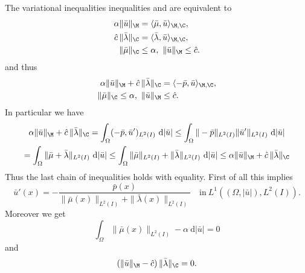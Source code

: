 The variational inequalities inequalities \label{var ineq mu} and \label{var ineq lambda} are equivalent to
\begin{align*}
\alpha\|\bar u\|_{\M}&=\langle \bar\mu,\bar u\rangle_{\M,\C},\\
\hat c\,\|\bar\lambda\|_{\C}&=\langle \bar\lambda,\bar u\rangle_{\M,\C},\\
\|\bar \mu\|_{\C}&\leq\alpha,~\|\bar u\|_{\M}\leq \hat c.
\end{align*}
and thus
\begin{align*}
\alpha\|\bar u\|_{\M}+\hat c\,\|\bar\lambda\|_{\C}&=\langle -\bar p,\bar u\rangle_{\M,\C},\\
\|\bar \mu\|_{\C}\leq\alpha,~\|\bar u\|_{\M}&\leq \hat c.
\end{align*}
In particular we have
\begin{multline*}
\alpha\|\bar u\|_{\M}+\hat c\,\|\bar\lambda\|_{\C}= \int_\Omega(-\bar p,\bar u')_{L^2(I)}~\mathrm d|\bar u|
\leq \int_\Omega\|-\bar p\|_{L^2(I)}\|\bar u'\|_{L^2(I)}~\mathrm d|\bar u|\\
= \int_\Omega\|\bar\mu+\bar\lambda\|_{L^2(I)}~\mathrm d|\bar u|
\leq\int_\Omega\|\bar\mu\|_{L^2(I)}+\|\bar\lambda\|_{L^2(I)}~\mathrm d|\bar u|
\leq\alpha\|\bar u\|_{\M}+\hat c\,\|\bar\lambda\|_{\C}
\end{multline*}
Thus the last chain of inequalities holds with equality. First of all this implies
\[
\bar u'(x)=-\frac{\bar p(x)}{\|\bar \mu(x)\|_{L^2(I)}+\|\bar\lambda(x)\|_{L^2(I)}}\quad\text{in}~L^1((\Omega,|\bar u|),L^2(I)).
\]
Moreover we get
\[
\int_\Omega\|\bar \mu(x)\|_{L^2(I)}-\alpha~\mathrm d|\bar u|=0
\]
and
\[
\left(\|\bar u\|_{\M}-\hat c\right)\|\bar\lambda\|_{\C}=0.
\]